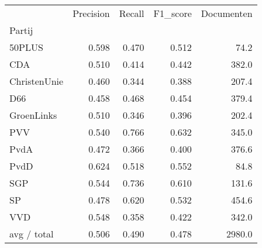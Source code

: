 \begin{tabular}{lrrrr}
\toprule
{} &  Precision &  Recall &  F1\_score &  Documenten \\
Partij       &            &         &           &             \\
\midrule
50PLUS       &      0.598 &   0.470 &     0.512 &        74.2 \\
   CDA       &      0.510 &   0.414 &     0.442 &       382.0 \\
ChristenUnie &      0.460 &   0.344 &     0.388 &       207.4 \\
   D66       &      0.458 &   0.468 &     0.454 &       379.4 \\
  GroenLinks &      0.510 &   0.346 &     0.396 &       202.4 \\
   PVV       &      0.540 &   0.766 &     0.632 &       345.0 \\
  PvdA       &      0.472 &   0.366 &     0.400 &       376.6 \\
  PvdD       &      0.624 &   0.518 &     0.552 &        84.8 \\
   SGP       &      0.544 &   0.736 &     0.610 &       131.6 \\
    SP       &      0.478 &   0.620 &     0.532 &       454.6 \\
   VVD       &      0.548 &   0.358 &     0.422 &       342.0 \\
 avg / total &      0.506 &   0.490 &     0.478 &      2980.0 \\
\bottomrule
\end{tabular}
